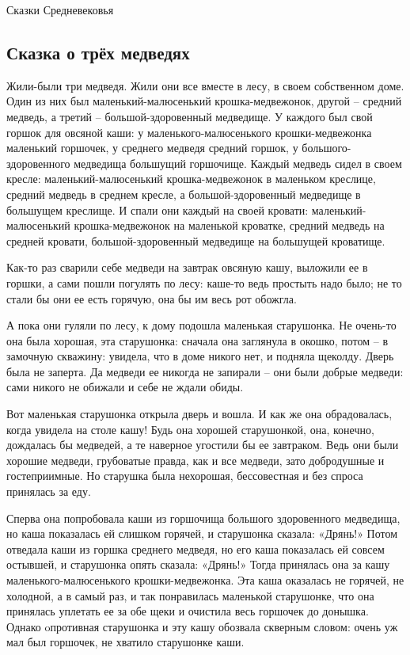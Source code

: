 \documentclass[12pt]{article}
\begin{document}
\begin{center}
    { %
        \textcolor{bordercol}{\fontsize{36pt}{40pt}\selectfont Сказки Средневековья}
    }
\end{center}

\subsection*{Сказка о трёх медведях}

Жили-были три медведя. Жили они все вместе в лесу, в своем собственном доме. Один из них был маленький-малюсенький крошка-медвежонок, другой – средний медведь, а третий – большой-здоровенный медведище. У каждого был свой горшок для овсяной каши: у маленького-малюсенького крошки-медвежонка маленький горшочек, у среднего медведя средний горшок, у большого-здоровенного медведища большущий горшочище. Каждый медведь сидел в своем кресле: маленький-малюсенький крошка-медвежонок в маленьком креслице, средний медведь в среднем кресле, а большой-здоровенный медведище в большущем креслище. И спали они каждый на своей кровати: маленький-малюсенький крошка-медвежонок на маленькой кроватке, средний медведь на средней кровати, большой-здоровенный медведище на большущей кроватище.

Как-то раз сварили себе медведи на завтрак овсяную кашу, выложили ее в горшки, а сами пошли погулять по лесу: каше-то ведь простыть надо было; не то стали бы они ее есть горячую, она бы им весь рот обожгла.

А пока они гуляли по лесу, к дому подошла маленькая старушонка. Не очень-то она была хорошая, эта старушонка: сначала она заглянула в окошко, потом – в замочную скважину: увидела, что в доме никого нет, и подняла щеколду. Дверь была не заперта. Да медведи ее никогда не запирали – они были добрые медведи: сами никого не обижали и себе не ждали обиды.

Вот маленькая старушонка открыла дверь и вошла. И как же она обрадовалась, когда увидела на столе кашу! Будь она хорошей старушонкой, она, конечно, дождалась бы медведей, а те наверное угостили бы ее завтраком. Ведь они были хорошие медведи, грубоватые правда, как и все медведи, зато добродушные и гостеприимные. Но старушка была нехорошая, бессовестная и без спроса принялась за еду.

Сперва она попробовала каши из горшочища большого здоровенного медведища, но каша показалась ей слишком горячей, и старушонка сказала: «Дрянь!» Потом отведала каши из горшка среднего медведя, но его каша показалась ей совсем остывшей, и старушонка опять сказала: «Дрянь!» Тогда принялась она за кашу маленького-малюсенького крошки-медвежонка. Эта каша оказалась не горячей, не холодной, а в самый раз, и так понравилась маленькой старушонке, что она принялась уплетать ее за обе щеки и очистила весь горшочек до донышка. Однако oпротивная старушонка и эту кашу обозвала скверным словом: очень уж мал был горшочек, не хватило старушонке каши.
\end{document}
